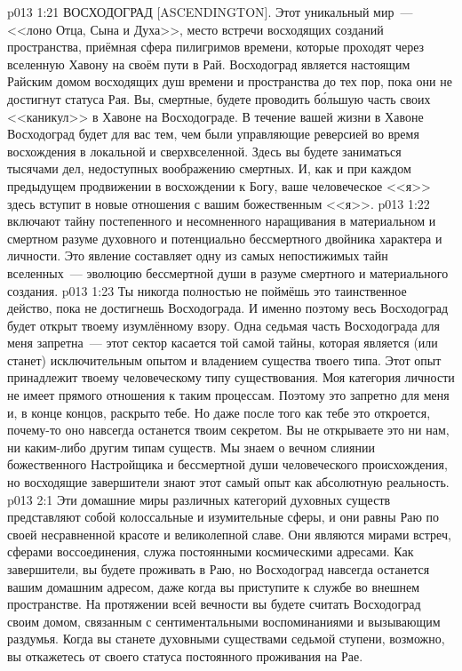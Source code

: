 \vs p013 1:21 ВОСХОДОГРАД [ASCENDINGTON]. Этот уникальный мир~--- <<лоно Отца, Сына и Духа>>, место встречи восходящих созданий пространства, приёмная сфера пилигримов времени, которые проходят через вселенную Хавону на своём пути в Рай. Восходоград является настоящим Райским домом восходящих душ времени и пространства до тех пор, пока они не достигнут статуса Рая. Вы, смертные, будете проводить б\'ольшую часть своих <<каникул>> в Хавоне на Восходограде. В течение вашей жизни в Хавоне Восходоград будет для вас тем, чем были управляющие реверсией во время восхождения в локальной и сверхвселенной. Здесь вы будете заниматься тысячами дел, недоступных воображению смертных. И, как и при каждом предыдущем продвижении в восхождении к Богу, ваше человеческое <<я>> здесь вступит в новые отношения с вашим божественным <<я>>.
\vs p013 1:22 \pc {} включают тайну постепенного и несомненного наращивания в материальном и смертном разуме духовного и потенциально бессмертного двойника характера и личности. Это явление составляет одну из самых непостижимых тайн вселенных~--- эволюцию бессмертной души в разуме смертного и материального создания.
\vs p013 1:23 Ты никогда полностью не поймёшь это таинственное действо, пока не достигнешь Восходограда. И именно поэтому весь Восходоград будет открыт твоему изумлённому взору. Одна седьмая часть Восходограда для меня запретна~--- этот сектор касается той самой тайны, которая является (или станет) исключительным опытом и владением существа твоего типа. Этот опыт принадлежит твоему человеческому типу существования. Моя категория личности не имеет прямого отношения к таким процессам. Поэтому это запретно для меня и, в конце концов, раскрыто тебе. Но даже после того как тебе это откроется, почему\hyp{}то оно навсегда останется твоим секретом. Вы не открываете это ни нам, ни каким\hyp{}либо другим типам существ. Мы знаем о вечном слиянии божественного Настройщика и бессмертной души человеческого происхождения, но восходящие завершители знают этот самый опыт как абсолютную реальность.
\vs p013 2:1 Эти домашние миры различных категорий духовных существ представляют собой колоссальные и изумительные сферы, и они равны Раю по своей несравненной красоте и великолепной славе. Они являются мирами встреч, сферами воссоединения, служа постоянными космическими адресами. Как завершители, вы будете проживать в Раю, но Восходоград навсегда останется вашим домашним адресом, даже когда вы приступите к службе во внешнем пространстве. На протяжении всей вечности вы будете считать Восходоград своим домом, связанным с сентиментальными воспоминаниями и вызывающим раздумья. Когда вы станете духовными существами седьмой ступени, возможно, вы откажетесь от своего статуса постоянного проживания на Рае.
